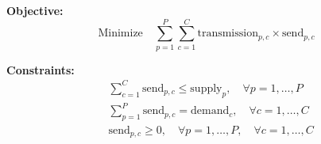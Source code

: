 \documentclass{article}
\begin{document}
\textbf{Objective:}
\[
\text{Minimize} \quad \sum_{p=1}^{P} \sum_{c=1}^{C} \text{transmission}_{p,c} \times \text{send}_{p,c}
\]

\textbf{Constraints:}
\begin{align*}
& \sum_{c=1}^{C} \text{send}_{p,c} \leq \text{supply}_p, \quad \forall p = 1, \ldots, P \\
& \sum_{p=1}^{P} \text{send}_{p,c} = \text{demand}_c, \quad \forall c = 1, \ldots, C \\
& \text{send}_{p,c} \geq 0, \quad \forall p = 1, \ldots, P, \quad \forall c = 1, \ldots, C
\end{align*}
\end{document}
